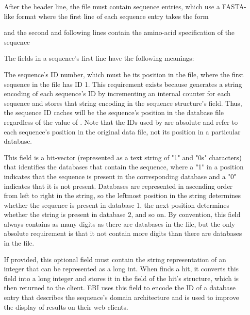 \documentclass[notoc,justified]{tufte-book}    %
\begin{document}
After the header line, the file must contain  sequence entries, which use a FASTA-like format where the first line of each sequence entry takes the form 


and the second and following lines contain the amino-acid specification of the sequence  

The fields in a sequence's first line have the following meanings:

\begin{sreitems}{}

\item [\monob{seq\_id}] The sequence's ID number, which must be its position in the file, where the first sequence in the file has ID 1. This requirement exists because  generates a string encoding of each sequence's ID by incrementing an internal counter for each sequence and stores that string encoding in the sequence structure's  field.  Thus, the sequence ID  caches will be the sequence's position in the database file regardless of the value of .  Note that the IDs used by  are absolute and refer to each sequence's position in the original data file, not its position in a particular database.

\item [\monob{database\_membership}] This field is a bit-vector (represented as a text string of "1" and "0s" characters) that identifies the databases that contain the sequence, where a "1" in a position indicates that the sequence is present in the corresponding database and a "0" indicates that it is not present.  Databases are represented in ascending order from left to right in the string, so the leftmost position in the string determines whether the sequence is present in database 1, the next position determines whether the string is present in database 2, and so on.  By convention, this field always contains as many digits as there are databases in the file, but the only absolute requirement is that it not contain more digits than there are databases in the file.

\item [\monob{domain\_architecture}] If provided, this optional field must contain the string representation of an integer that can be represented as a long int.  When  finds a hit, it converts this field into a long integer and stores it in the  field of the hit's  structure, which is then returned to the client.  EBI uses this field to encode the ID of a database entry that describes the sequence's domain architecture and is used to improve the display of results on their web clients.   


\end{sreitems}
\end{document}
